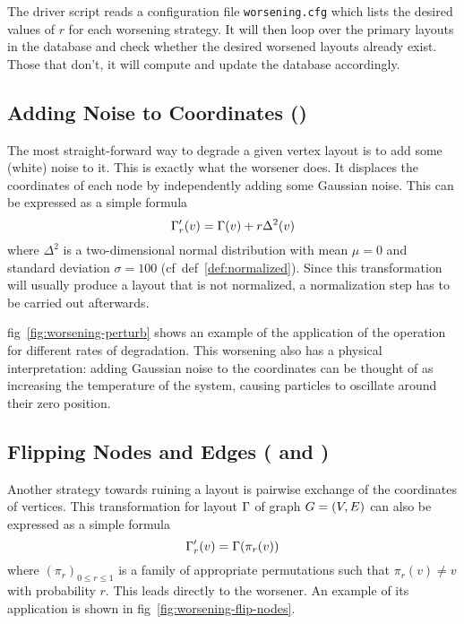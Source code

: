 \documentclass{graphstudy}
\begin{document}
The driver script reads a configuration file \verb`worsening.cfg` which lists the desired values of \(r\) for each
worsening strategy.  It will then loop over the primary layouts in the database and check whether the desired worsened
layouts already exist.  Those that don't, it will compute and update the database accordingly.

\subsection{Adding Noise to Coordinates ()}
\label{sec:perturb}

The most straight-forward way to degrade a given vertex layout is to add some (white) noise to it.  This is exactly what
the  worsener does.  It displaces the coordinates of each node by independently adding some Gaussian
noise.  This can be expressed as a simple formula
\begin{equation}
  \Gamma_r'(v) = \Gamma(v) + r\Delta^2(v)
\end{equation}
where \(\Delta^2\) is a two-dimensional normal distribution with mean \(\mu=0\) and standard deviation \(\sigma=100\)
(\ac{cf}~\acs{def}~\ref{def:normalized}).  Since this transformation will usually produce a layout that is not
normalized, a normalization step has to be carried out afterwards.

\Acl{fig}~\ref{fig:worsening-perturb} shows an example of the application of the  operation for different
rates of degradation.  This worsening also has a physical interpretation: adding Gaussian noise to the coordinates can
be thought of as increasing the temperature of the system, causing particles to oscillate around their zero position.


\subsection{Flipping Nodes and Edges ( and )}
\label{sec:flip-nodes}
\label{sec:flip-edges}

Another strategy towards ruining a layout is pairwise exchange of the coordinates of vertices.  This transformation for
layout \(\Gamma\) of graph \(G=(V,E)\) can also be expressed as a simple formula
\begin{equation}
  \Gamma_r'(v) = \Gamma(\pi_r(v))
\end{equation}
where \((\pi_r)_{0\leq{r}\leq1}\) is a family of appropriate permutations such that \(\pi_r(v)\neq{}v\) with probability
\(r\).  This leads directly to the  worsener.  An example of its application is shown in
\acl{fig}~\ref{fig:worsening-flip-nodes}.
\end{document}
